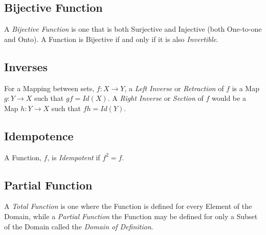 \documentclass{article}
\begin{document}
\subsection{Bijective Function}\label{subsec:bijective_function}

A \emph{Bijective Function} is one that is both Surjective and
Injective (both One-to-one and Onto). A Function is Bijective if and
only if it is also \emph{Invertible}.



\subsection{Inverses}\label{subsec:inverse_functions}

For a Mapping between sets, $f: X \rightarrow Y$, a \emph{Left
  Inverse} or \emph{Retraction} of $f$ is a Map $g: Y \rightarrow X$
such that $gf = Id(X)$. A \emph{Right Inverse} or \emph{Section} of
$f$ would be a Map $h: Y \rightarrow X$ such that $fh = Id(Y)$.



\subsection{Idempotence}\label{subsec:idempotence}

A Function, $f$, is \emph{Idempotent} if $f^2 = f$.



\subsection{Partial Function}\label{subsec:partial_function}

A \emph{Total Function} is one where the Function is defined for every
Element of the Domain, while a \emph{Partial Function} the Function
may be defined for only a Subset of the Domain called the \emph{Domain
  of Definition}.



\end{document}
